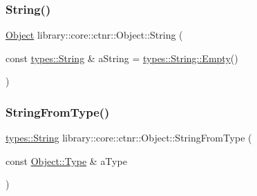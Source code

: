 \mbox{\label{classlibrary_1_1core_1_1ctnr_1_1_object_a4f6eb8f93e1907ac91b6055c456f9ec3}} 
\subsubsection{\texorpdfstring{String()}{String()}}
{\footnotesize\ttfamily \mbox{\hyperlink{classlibrary_1_1core_1_1ctnr_1_1_object}{Object}} library\+::core\+::ctnr\+::\+Object\+::\+String (\begin{DoxyParamCaption}\item[{const \mbox{\hyperlink{classlibrary_1_1core_1_1types_1_1_string}{types\+::\+String}} \&}]{a\+String = {\ttfamily \mbox{\hyperlink{classlibrary_1_1core_1_1types_1_1_string_a4d359cb0dba46e14ca46f90e728c2b96}{types\+::\+String\+::\+Empty}}()} }\end{DoxyParamCaption})\hspace{0.3cm}{\ttfamily [static]}}

\mbox{\label{classlibrary_1_1core_1_1ctnr_1_1_object_ab070a3b341e562c587373644147c3006}} 
\subsubsection{\texorpdfstring{StringFromType()}{StringFromType()}}
{\footnotesize\ttfamily \mbox{\hyperlink{classlibrary_1_1core_1_1types_1_1_string}{types\+::\+String}} library\+::core\+::ctnr\+::\+Object\+::\+String\+From\+Type (\begin{DoxyParamCaption}\item[{const \mbox{\hyperlink{classlibrary_1_1core_1_1ctnr_1_1_object_a0766006ad111133d70349019551b31d6}{Object\+::\+Type}} \&}]{a\+Type }\end{DoxyParamCaption})\hspace{0.3cm}{\ttfamily [static]}}

\mbox{\label{classlibrary_1_1core_1_1ctnr_1_1_object_a5398bda4792be6ad5c2d07429c83d110}} 
